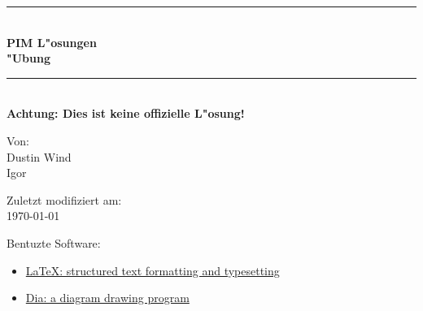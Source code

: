 

\newcommand{\TitleHRule}{\rule{\linewidth}{0.5mm}}

\begin{titlepage}
    \begin{center}

    \TitleHRule \\[0.4cm]
    { \huge \bfseries PIM L"osungen\\"Ubung\\[0.4cm] }
    \TitleHRule \\[1.5cm]

    \textbf{Achtung: Dies ist keine offizielle L"osung!}

    \vfill
    Von:\\
    Dustin Wind\\
    Igor


   \vfill
    Zuletzt modifiziert am:\\
    {\large \today}\\
    \end{center}
    \bigskip

    {\small
    Bentuzte Software:
    \begin{itemize}
        \item \href{http://www.latex-project.org}{\LaTeX{}: structured text formatting and typesetting}
        \item \href{https://wiki.gnome.org/Apps/Dia/}{Dia: a diagram drawing program}
    \end{itemize}
    }

\end{titlepage}

